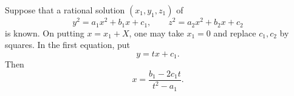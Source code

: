 \begin{proposition}
Suppose that a rational solution $(x_1,y_1,z_1)$ of
\[
    y^2=a_1x^2+b_1x+c_1,\qquad z^2=a_2x^2+b_2x+c_2
\]
is known. On putting $x=x_1+X$, one may take $x_1=0$ and replace
$c_1,c_2$ by squares. In the first equation, put
\[
    y=tx+c_1.
\]
Then
\[
    x=\frac{b_1-2c_1t}{t^2-a_1}.
\]
\end{proposition}
